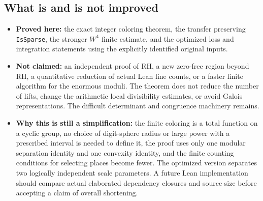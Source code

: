 \documentclass[11pt]{article}
\theoremstyle{remark}\newtheorem{remark}[theorem]{Remark}
\newcommand{\src}[1]{\texttt{#1}}
\begin{document}
\subsection{What is and is not improved}
\begin{itemize}[leftmargin=*]
\item \textbf{Proved here:} the exact integer coloring theorem, the transfer preserving \src{IsSparse}, the stronger $W^4$ finite estimate, and the optimized loss and integration statements using the explicitly identified original inputs.
\item \textbf{Not claimed:} an independent proof of RH, a new zero-free region beyond RH, a quantitative reduction of actual Lean line counts, or a faster finite algorithm for the enormous moduli. The theorem does not reduce the number of lifts, change the arithmetic local divisibility estimates, or avoid Galois representations. The difficult determinant and congruence machinery remains.
\item \textbf{Why this is still a simplification:} the finite coloring is a total function on a cyclic group, no choice of digit-sphere radius or large power with a prescribed interval is needed to define it, the proof uses only one modular separation identity and one convexity identity, and the finite counting conditions for selecting places become fewer. The optimized version separates two logically independent scale parameters. A future Lean implementation should compare actual elaborated dependency closures and source size before accepting a claim of overall shortening.
\end{itemize}
\end{document}
